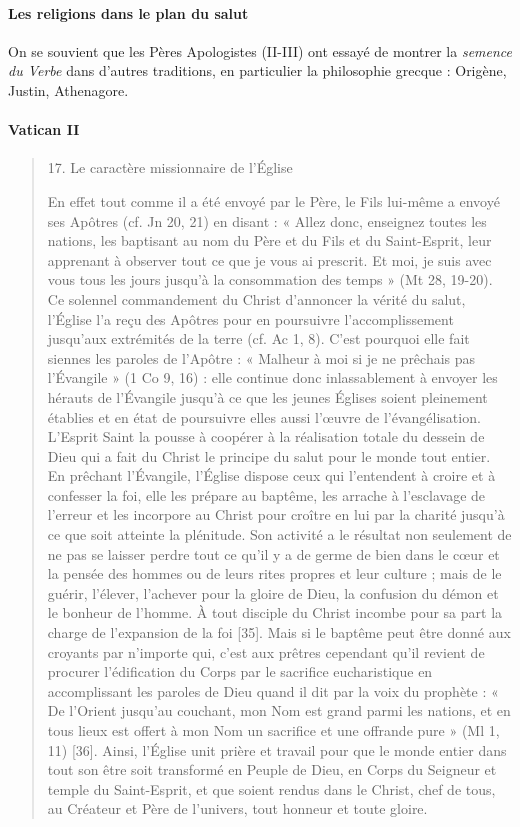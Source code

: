 \paragraph{Les religions dans le plan du salut} On se souvient que les Pères Apologistes (II-III) ont essayé de montrer la \textit{semence du Verbe} dans d'autres traditions, en particulier la philosophie grecque : Origène, Justin, Athenagore. 

\paragraph{Vatican II}
\begin{quote}
    17. Le caractère missionnaire de l’Église

En effet tout comme il a été envoyé par le Père, le Fils lui-même a envoyé ses Apôtres (cf. Jn 20, 21) en disant : « Allez donc, enseignez toutes les nations, les baptisant au nom du Père et du Fils et du Saint-Esprit, leur apprenant à observer tout ce que je vous ai prescrit. Et moi, je suis avec vous tous les jours jusqu’à la consommation des temps » (Mt 28, 19-20). Ce solennel commandement du Christ d’annoncer la vérité du salut, l’Église l’a reçu des Apôtres pour en poursuivre l’accomplissement jusqu’aux extrémités de la terre (cf. Ac 1, 8). C’est pourquoi elle fait siennes les paroles de l’Apôtre : « Malheur à moi si je ne prêchais pas l’Évangile » (1 Co 9, 16) : elle continue donc inlassablement à envoyer les hérauts de l’Évangile jusqu’à ce que les jeunes Églises soient pleinement établies et en état de poursuivre elles aussi l’œuvre de l’évangélisation. L’Esprit Saint la pousse à coopérer à la réalisation totale du dessein de Dieu qui a fait du Christ le principe du salut pour le monde tout entier. En prêchant l’Évangile, l’Église dispose ceux qui l’entendent à croire et à confesser la foi, elle les prépare au baptême, les arrache à l’esclavage de l’erreur et les incorpore au Christ pour croître en lui par la charité jusqu’à ce que soit atteinte la plénitude. Son activité a le résultat non seulement de ne pas se laisser perdre tout ce qu’il y a de germe de bien dans le cœur et la pensée des hommes ou de leurs rites propres et leur culture ; mais de le guérir, l’élever, l’achever pour la gloire de Dieu, la confusion du démon et le bonheur de l’homme. À tout disciple du Christ incombe pour sa part la charge de l’expansion de la foi [35]. Mais si le baptême peut être donné aux croyants par n’importe qui, c’est aux prêtres cependant qu’il revient de procurer l’édification du Corps par le sacrifice eucharistique en accomplissant les paroles de Dieu quand il dit par la voix du prophète : « De l’Orient jusqu’au couchant, mon Nom est grand parmi les nations, et en tous lieux est offert à mon Nom un sacrifice et une offrande pure » (Ml 1, 11) [36]. Ainsi, l’Église unit prière et travail pour que le monde entier dans tout son être soit transformé en Peuple de Dieu, en Corps du Seigneur et temple du Saint-Esprit, et que soient rendus dans le Christ, chef de tous, au Créateur et Père de l’univers, tout honneur et toute gloire.
\end{quote}


